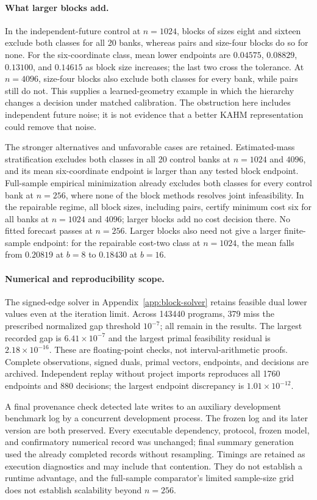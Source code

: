 \paragraph{What larger blocks add.}
In the independent-future control at $n=1024$, blocks of sizes eight and
sixteen exclude both classes for all 20 banks, whereas pairs and size-four
blocks do so for none. For the six-coordinate class, mean lower endpoints
are $0.04575$, $0.08829$, $0.13100$, and $0.14615$ as block size increases;
the last two cross the tolerance. At $n=4096$, size-four blocks also exclude
both classes for every bank, while pairs still do not. This supplies a
learned-geometry example in which the hierarchy changes a decision under
matched calibration. The obstruction here includes independent future noise;
it is not evidence that a better KAHM representation could remove that noise.

The stronger alternatives and unfavorable cases are retained.
Estimated-mass stratification excludes both classes in all 20 control banks
at $n=1024$ and $4096$, and its mean six-coordinate endpoint is larger than
any tested block endpoint. Full-sample empirical minimization already excludes
both classes for every control bank at $n=256$, where none of the block
methods resolves joint infeasibility. In the repairable regime, all block
sizes, including pairs, certify minimum cost six for all banks at $n=1024$
and $4096$; larger blocks add no cost decision there. No fitted forecast
passes at $n=256$. Larger blocks also need not give a larger finite-sample
endpoint: for the repairable cost-two class at $n=1024$, the mean falls
from $0.20819$ at $b=8$ to $0.18430$ at $b=16$.

\paragraph{Numerical and reproducibility scope.}
The signed-edge solver in Appendix~\ref{app:block-solver} retains feasible
dual lower values even at the iteration limit. Across 143440 programs,
379 miss the prescribed normalized gap threshold $10^{-7}$; all remain in
the results. The largest recorded gap is $6.41\times10^{-7}$ and the largest
primal feasibility residual is $2.18\times10^{-16}$. These are floating-point
checks, not interval-arithmetic proofs. Complete observations, signed duals,
primal vectors, endpoints, and decisions are archived. Independent replay
without project imports reproduces all 1760 endpoints and 880 decisions;
the largest endpoint discrepancy is $1.01\times10^{-12}$.

A final provenance check detected late writes to an auxiliary development
benchmark log by a concurrent development process. The frozen log and its
later version are both preserved. Every executable dependency, protocol,
frozen model, and confirmatory numerical record was unchanged; final summary
generation used the already completed records without resampling. Timings are
retained as execution diagnostics and may include that contention. They do
not establish a runtime advantage, and the full-sample comparator's limited
sample-size grid does not establish scalability beyond $n=256$.
